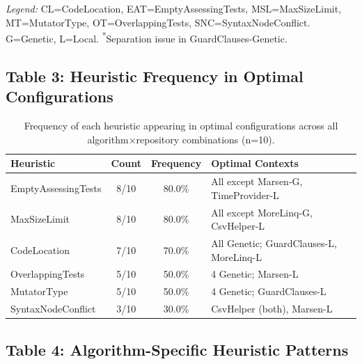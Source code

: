 \documentclass{article}
\begin{document}
\textit{Legend:} CL=CodeLocation, EAT=EmptyAssessingTests, MSL=MaxSizeLimit, MT=MutatorType, OT=OverlappingTests, SNC=SyntaxNodeConflict. G=Genetic, L=Local. \textsuperscript{*}Separation issue in GuardClauses-Genetic.


\subsection*{Table 3: Heuristic Frequency in Optimal Configurations}

\begin{table}[h]
\centering
\caption{Frequency of each heuristic appearing in optimal configurations across all algorithm×repository combinations (n=10).}
\label{tab:frequency}
\begin{tabular}{@{}lccp{5.5cm}@{}}
\toprule
\textbf{Heuristic} & \textbf{Count} & \textbf{Frequency} & \textbf{Optimal Contexts} \\
\midrule
EmptyAssessingTests  & 8/10 & 80.0\% & All except Marsen-G, TimeProvider-L \\
MaxSizeLimit         & 8/10 & 80.0\% & All except MoreLinq-G, CsvHelper-L \\
CodeLocation         & 7/10 & 70.0\% & All Genetic; GuardClauses-L, MoreLinq-L \\
OverlappingTests     & 5/10 & 50.0\% & 4 Genetic; Marsen-L \\
MutatorType          & 5/10 & 50.0\% & 4 Genetic; GuardClauses-L \\
SyntaxNodeConflict   & 3/10 & 30.0\% & CsvHelper (both), Marsen-L \\
\bottomrule
\end{tabular}
\end{table}


\subsection*{Table 4: Algorithm-Specific Heuristic Patterns}
\end{document}
